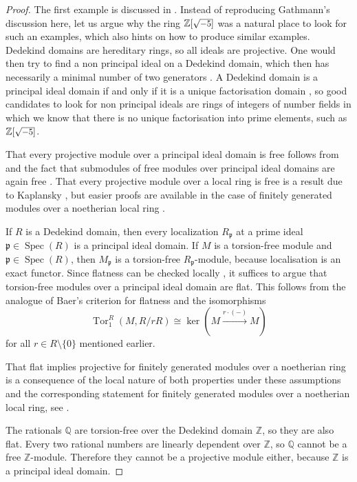 \documentclass[A4paper, 12pt, british, reqno]{amsart}
\newcommand{\Q}{\mathbb{Q}} %
\newcommand{\Z}{\mathbb{Z}} %
\newcommand{\p}{\mathfrak{p}}
\theoremstyle{plain}
\theoremstyle{definition}
\theoremstyle{remark}
\theoremstyle{plain}
\theoremstyle{definition}
\theoremstyle{remark}
\theoremstyle{plain}
\theoremstyle{definition}
\theoremstyle{remark}
\DeclareMathOperator{\Spec}{Spec}
\DeclareMathOperator{\Tor}{Tor}
\begin{document}
{\color{gray}
\begin{proof}
    The first example is discussed in \cite[Example 13.8]{gat14}.
    Instead of reproducing Gathmann's discussion here, let us argue why the ring $\Z[\scalebox{.9}{$\sqrt{-5}$}]$ was a natural place to look for such an examples, which also hints on how to produce similar examples.
    Dedekind domains are hereditary rings, so all ideals are projective.
    One would then try to find a non principal ideal on a Dedekind domain, which then has necessarily a minimal number of two generators \cite[Exercise I.3.6]{neu99}.
    A Dedekind domain is a principal ideal domain if and only if it is a unique factorisation domain \cite[Proposition 13.27]{gat14}, so good candidates to look for non principal ideals are rings of integers of number fields in which we know that there is no unique factorisation into prime elements, such as $\Z[\scalebox{.9}{$\sqrt{-5}$}]$.

    That every projective module over a principal ideal domain is free follows from  and the fact that submodules of free modules over principal ideal domains are again free \cite[Theorem 9.8]{rot02}.
    That every projective module over a local ring is free is a result due to Kaplansky \cite[Corollary 26.7]{af92}, but easier proofs are available in the case of finitely generated modules over a noetherian local ring \cite[Proposition 1.3.1]{fra18}.

    If $R$ is a Dedekind domain, then every localization $R_{\p}$ at a prime ideal $\p\in \Spec(R)$ is a principal ideal domain.
    If $M$ is a torsion-free module and $\p\in \Spec(R)$, then $M_{\p}$ is a torsion-free $R_{\p}$-module, because localisation is an exact functor.
    Since flatness can be checked locally \cite[Fact 1.2.6]{fra18}, it suffices to argue that torsion-free modules over a principal ideal domain are flat.
    This follows from the analogue of Baer's criterion for flatness \cite[Proposition 1.2.3]{fra18} and the isomorphisms
    \[ \Tor^{R}_{1}(M,R/rR)\cong \ker(M\xrightarrow{r\cdot (-)}M) \]
    for all $r\in R\setminus\{ 0\}$ mentioned earlier.

    That flat implies projective for finitely generated modules over a noetherian ring is a consequence of the local nature of both properties under these assumptions and the corresponding statement for finitely generated modules over a noetherian local ring, see \cite[Proposition 1.3.2]{fra18}.

    The rationals $\Q$ are torsion-free over the Dedekind domain $\Z$, so they are also flat.
    Every two rational numbers are linearly dependent over $\Z$, so $\Q$ cannot be a free $\Z$-module.
    Therefore they cannot be a projective module either, because $\Z$ is a principal ideal domain.


\end{proof}}
\end{document}
